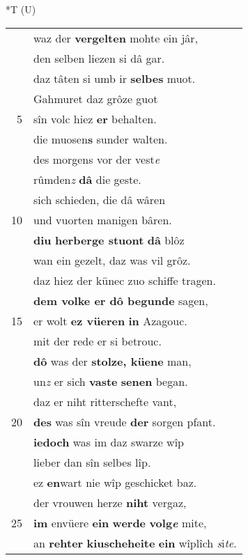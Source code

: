 \documentclass[8pt,a4paper,notitlepage]{article}
\begin{document}
\begin{table}[ht]
\hspace{0.5cm}
\begin{minipage}[t]{0.5\linewidth}
\small
\begin{center}*T (U)
\end{center}
\begin{tabular}{rl}
 & waz der \textbf{vergelten} mohte ein jâr,\\ 
 & den selben liezen si dâ gar.\\ 
 & daz tâten si umb ir \textbf{selbes} muot.\\ 
 & Gahmuret daz grôze guot\\ 
5 & sîn volc hiez \textbf{er} behalten.\\ 
 & die muosen\textbf{s} sunder walten.\\ 
 & des morgens vor der vest\textit{e}\\ 
 & rûmden\textit{z} \textbf{dâ} die geste.\\ 
 & sich schieden, die dâ wâren\\ 
10 & und vuorten manigen bâren.\\ 
 & \textbf{diu} \textbf{herberge stuont} \textbf{dâ} blôz\\ 
 & wan ein gezelt, daz was vil grôz.\\ 
 & daz hiez der künec zuo schiffe tragen.\\ 
 & \textbf{dem volke er dô begunde} sagen,\\ 
15 & er wolt \textbf{ez vüeren} \textbf{in} Azagouc.\\ 
 & mit der rede er si betrouc.\\ 
 & \textbf{dô} was der \textbf{stolze, küene} man,\\ 
 & un\textit{z} er sich \textbf{vaste} \textbf{senen} began.\\ 
 & daz er niht ritterschefte vant,\\ 
20 & \textbf{des} was sîn vreude \textbf{der} sorgen pfant.\\ 
 & \textbf{iedoch} was im daz swarze wîp\\ 
 & lieber dan sîn selbes lîp.\\ 
 & ez \textbf{en}wart nie wîp geschicket baz.\\ 
 & der vrouwen herze \textbf{niht} vergaz,\\ 
25 & \textbf{im} envüere \textbf{ein} \textbf{werde} \textbf{volg\textit{e}} mite,\\ 
 & an \textbf{rehter} \textbf{kiuscheheite} \textbf{ein} wîplîch \textit{s}i\textit{te}.\\ 

\end{tabular}
\end{minipage}
\end{table}
\end{document}
